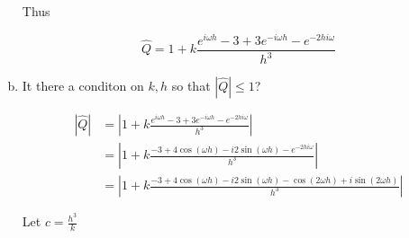 \documentclass[11pt]{amsart}
\numberwithin{equation}{section}
\begin{document}
\begin{enumerate}[a)]
{          Thus
          
          \begin{equation}
              \hat Q = 1 + k \frac{e^{i\omega h} - 3 + 3e^{- i\omega h} - e^{-2h i\omega}}{h^3}
          \end{equation}
          
          }
          
    \item It there a conditon on $k, h$ so that $|\hat{Q}| \le 1$?\\
          
          {\color{blue}
          
          \begin{align}
              |\hat Q| & = \left| 1 + k \frac{e^{i\omega h} - 3 + 3e^{- i\omega h} - e^{-2h i\omega}}{h^3} \right|                          \\
                       & = \left| 1 + k \frac{- 3 + 4\cos(\omega h) - i2\sin(\omega h) - e^{-2h i\omega}}{h^3} \right|                      \\
                       & =  \left| 1 + k \frac{- 3 + 4\cos(\omega h) - i2\sin(\omega h) - \cos(2 \omega h) + i\sin(2\omega h)}{h^3} \right|
          \end{align}
          
          Let $c = \frac{h^3}{k}$
          
}
\end{enumerate}
\end{document}

